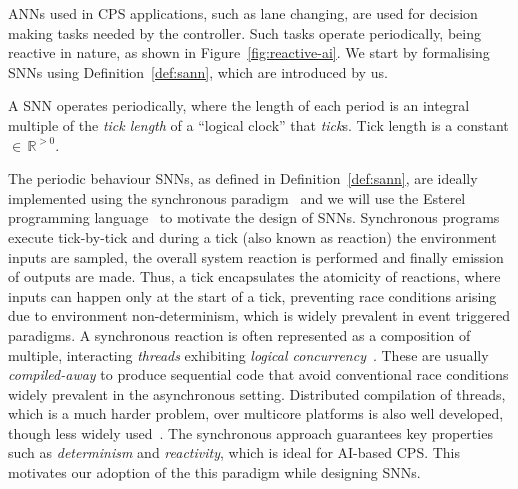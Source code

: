 \acp{ANN} used in \ac{CPS} applications, such as lane changing, are used for decision making tasks 
needed by the controller. Such tasks operate periodically, being reactive in nature,
as shown in Figure~\ref{fig:reactive-ai}. We start by formalising \acp{SNN} using Definition~\ref{def:sann},
which are introduced by us. 

\begin{definition}
	\label{def:sann}
	A \acf{SNN} operates periodically, where the length of each period is 
	an integral multiple of the \emph{tick length} of a ``logical clock'' that \emph{tick}s. Tick length
	is a constant $\in \, \mathbb{R}^{>0}$.
\end{definition}

The periodic behaviour \acp{SNN}, as defined in Definition~\ref{def:sann}, are ideally implemented using the synchronous 
paradigm~\cite{benveniste2003synchronous} and we will use the Esterel programming language~\cite{berry2000foundations} 
to motivate the design of \acp{SNN}. Synchronous programs execute tick-by-tick and during a tick (also known as reaction) the
environment inputs are sampled, the overall system reaction is performed and finally emission of outputs are made. Thus, a tick encapsulates 
the atomicity of reactions, where inputs can happen only at the start of a tick, preventing race conditions arising due to environment 
non-determinism, which is widely prevalent in event triggered paradigms. A synchronous reaction is often represented as a composition of 
multiple, interacting \emph{threads} exhibiting \emph{logical concurrency}~\cite{benveniste2003synchronous}. 
These are usually \emph{compiled-away} to produce sequential code 
that avoid conventional race conditions widely prevalent in the asynchronous setting. Distributed compilation of threads, which is a much harder problem, over
multicore platforms is also well developed, though less widely used~\cite{yuan2011compiling}. The synchronous approach guarantees
key properties such as \emph{determinism} and \emph{reactivity}, which is ideal for AI-based CPS. This motivates 
our adoption of the this paradigm while designing \acp{SNN}.


